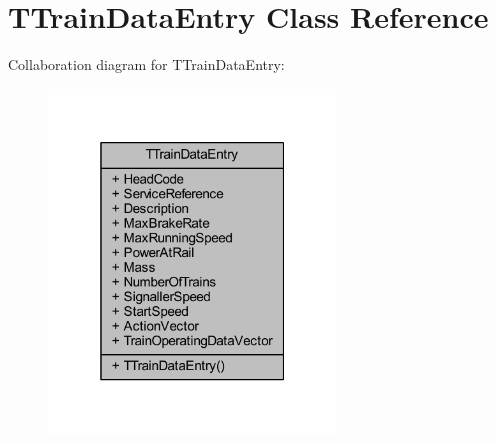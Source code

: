 \hypertarget{class_t_train_data_entry}{}\section{T\+Train\+Data\+Entry Class Reference}
\label{class_t_train_data_entry}


Collaboration diagram for T\+Train\+Data\+Entry\+:\nopagebreak
\begin{figure}[H]
\begin{center}
\leavevmode
\includegraphics[width=217pt]{class_t_train_data_entry__coll__graph}
\end{center}
\end{figure}
